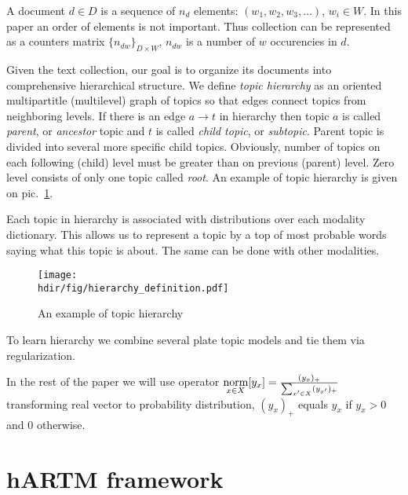 \documentclass[12pt, twoside]{article}
\newcommand{\hdir}{.}
\begin{document}
A document $d \in D$ is a sequence of $n_d$ elements: $(w_1, w_2, w_3, \dots)$, $w_i \in W$. In this paper an order of elements is not important. Thus collection can be represented as a counters matrix $\{n_{dw}\}_{D \times W}$, $n_{dw}$ is a number of $w$ occurencies in $d$.

Given the text collection, our goal is to organize its documents into comprehensive hierarchical structure. We define \emph{topic hierarchy} as an oriented multipartitle (multilevel) graph of topics so that edges connect topics from neighboring levels. If there is an edge $a \rightarrow t$ in hierarchy then topic $a$ is called \emph{parent}, or \emph{ancestor} topic and $t$ is called \emph{child topic}, or \emph{subtopic}. Parent topic is divided into several more specific child topics. 
Obviously, number of topics on each following (child) level must be greater than on previous (parent) level. Zero level consists of only one topic called \emph{root}. An example of topic hierarchy is given on pic.~\ref{fg:hierarchy}.

Each topic in hierarchy is associated with distributions over each modality dictionary. This allows us to represent a topic by a top of most probable words saying what this topic is about. The same can be done with other modalities.
\begin{figure}[!th]
	\begin{center}
		\texttt{[image: \\hdir/fig/hierarchy\_definition.pdf]}
	\end{center}
	\caption{An example of topic hierarchy}
	\label{fg:hierarchy}
\end{figure}

To learn hierarchy we combine several plate topic models and tie them via regularization.

In the rest of the paper we will use operator 
$\mathop{\text{norm}}\limits_{x \in X} [y_x] = \frac{( y_x )_+}
{\sum_{x' \in X}( y_{x'})_+}$ transforming real vector to probability distribution, $(y_x)_+$ equals $y_x$ if $y_x > 0$ and $0$ otherwise.



\section{hARTM framework}
\label{hARTM} 
\end{document}
